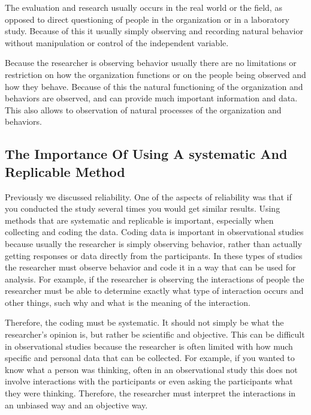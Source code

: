 \documentclass[]{book}
\theoremstyle{definition}
\theoremstyle{definition}
\theoremstyle{definition}
\theoremstyle{remark}
\begin{document}
The evaluation and research usually occurs in the real world or the
field, as opposed to direct questioning of people in the organization or
in a laboratory study. Because of this it usually simply observing and
recording natural behavior without manipulation or control of the
independent variable.

Because the researcher is observing behavior usually there are no
limitations or restriction on how the organization functions or on the
people being observed and how they behave. Because of this the natural
functioning of the organization and behaviors are observed, and can
provide much important information and data. This also allows to
observation of natural processes of the organization and behaviors.

\hypertarget{the-importance-of-using-a-systematic-and-replicable-method}{%
\subsection{The Importance Of Using A systematic And Replicable
Method}\label{the-importance-of-using-a-systematic-and-replicable-method}}

Previously we discussed reliability. One of the aspects of reliability
was that if you conducted the study several times you would get similar
results. Using methods that are systematic and replicable is important,
especially when collecting and coding the data. Coding data is important
in observational studies because usually the researcher is simply
observing behavior, rather than actually getting responses or data
directly from the participants. In these types of studies the researcher
must observe behavior and code it in a way that can be used for
analysis. For example, if the researcher is observing the interactions
of people the researcher must be able to determine exactly what type of
interaction occurs and other things, such why and what is the meaning of
the interaction.

Therefore, the coding must be systematic. It should not simply be what
the researcher's opinion is, but rather be scientific and objective.
This can be difficult in observational studies because the researcher is
often limited with how much specific and personal data that can be
collected. For example, if you wanted to know what a person was
thinking, often in an observational study this does not involve
interactions with the participants or even asking the participants what
they were thinking. Therefore, the researcher must interpret the
interactions in an unbiased way and an objective way.
\end{document}

